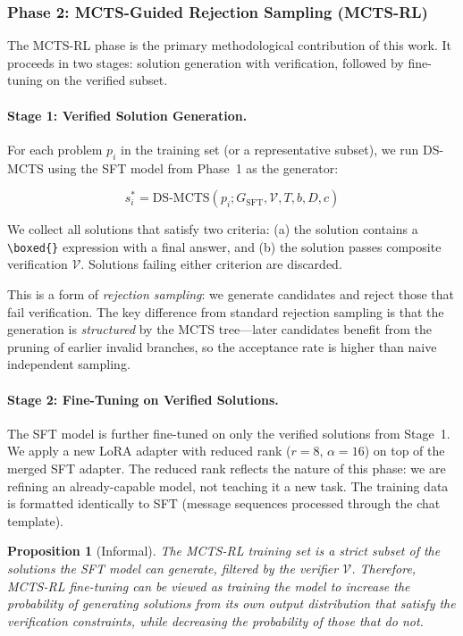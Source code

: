 \documentclass[11pt,a4paper]{article}
\newtheorem{proposition}{Proposition}
\begin{document}
\subsubsection{Phase 2: MCTS-Guided Rejection Sampling (MCTS-RL)}

The MCTS-RL phase is the primary methodological contribution of this work. It
proceeds in two stages: solution generation with verification, followed by
fine-tuning on the verified subset.

\paragraph{Stage 1: Verified Solution Generation.}
For each problem $p_i$ in the training set (or a representative subset), we run
DS-MCTS using the SFT model from Phase~1 as the generator:

\begin{equation}
s_i^* = \text{DS-MCTS}(p_i; G_{\text{SFT}}, \mathcal{V}, T, b, D, c)
\end{equation}

We collect all solutions that satisfy two criteria: (a) the solution contains a
\verb|\boxed{}| expression with a final answer, and (b) the solution passes
composite verification $\mathcal{V}$. Solutions failing either criterion are
discarded.

This is a form of \emph{rejection sampling}: we generate candidates and reject
those that fail verification. The key difference from standard rejection
sampling is that the generation is \emph{structured} by the MCTS tree---later
candidates benefit from the pruning of earlier invalid branches, so the
acceptance rate is higher than naive independent sampling.

\paragraph{Stage 2: Fine-Tuning on Verified Solutions.}
The SFT model is further fine-tuned on only the verified solutions from
Stage~1. We apply a new LoRA adapter with reduced rank ($r = 8$, $\alpha = 16$)
on top of the merged SFT adapter. The reduced rank reflects the nature of
this phase: we are refining an already-capable model, not teaching it a new
task. The training data is formatted identically to SFT (message sequences
processed through the chat template).

\begin{proposition}[Informal]
The MCTS-RL training set is a strict subset of the solutions the SFT model
can generate, filtered by the verifier $\mathcal{V}$. Therefore, MCTS-RL
fine-tuning can be viewed as training the model to increase the probability of
generating solutions from its own output distribution that satisfy the
verification constraints, while decreasing the probability of those that do not.
\end{proposition}
\end{document}
